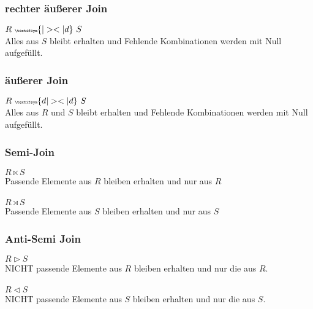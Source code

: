 \subsubsection{rechter äußerer Join}
$R ~{\tiny \textifsym{|><|d}}~ S$\\
Alles aus $S$ bleibt erhalten und Fehlende Kombinationen werden mit Null aufgefüllt. 
\subsubsection{äußerer Join}
$R ~{\tiny \textifsym{d|><|d}}~ S$\\
Alles aus $R$ und $S$ bleibt erhalten und Fehlende Kombinationen werden mit Null aufgefüllt. 
\subsubsection{Semi-Join}
$R \ltimes S$\\
Passende Elemente aus $R$ bleiben erhalten und nur aus $R$ \\
\qquad\\
$R \rtimes S$\\
Passende Elemente aus $S$ bleiben erhalten und nur aus $S$
\subsubsection{Anti-Semi Join}
$R \triangleright S$\\
NICHT passende Elemente aus $R$ bleiben erhalten und nur die aus $R$. \\
\qquad\\
$R \triangleleft S$\\
NICHT passende Elemente aus $S$ bleiben erhalten und nur die aus $S$. 
